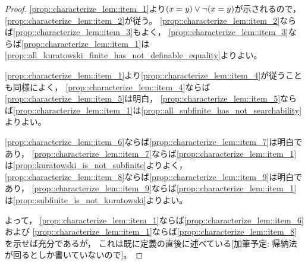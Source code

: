 \begin{proof}
    \cref{prop::characterize_lem::item_1}より\((x=y)\vee\neg(x=y)\)が示されるので，
    \cref{prop::characterize_lem::item_2}が従う。
    \cref{prop::characterize_lem::item_2}ならば\cref{prop::characterize_lem::item_3}もよく，
    \cref{prop::characterize_lem::item_3}ならば\cref{prop::characterize_lem::item_1}は\cref{prop::all_kuratowski_finite_has_not_definable_equality}よりよい。

    \cref{prop::characterize_lem::item_1}より\cref{prop::characterize_lem::item_4}が従うことも同様によく，
    \cref{prop::characterize_lem::item_4}ならば\cref{prop::characterize_lem::item_5}は明白，
    \cref{prop::characterize_lem::item_5}ならば\cref{prop::characterize_lem::item_1}は\cref{prop::all_subfinite_has_not_searchability}よりよい。

    \cref{prop::characterize_lem::item_6}ならば\cref{prop::characterize_lem::item_7}は明白であり，
    \cref{prop::characterize_lem::item_7}ならば\cref{prop::characterize_lem::item_1}は\cref{prop::kuratowski_is_not_subfinite}よりよく，
    \cref{prop::characterize_lem::item_8}ならば\cref{prop::characterize_lem::item_9}は明白であり，
    \cref{prop::characterize_lem::item_9}ならば\cref{prop::characterize_lem::item_1}は\cref{prop::subfinite_is_not_kuratowski}よりよい。

    よって，
    \cref{prop::characterize_lem::item_1}ならば\cref{prop::characterize_lem::item_6}および
    \cref{prop::characterize_lem::item_1}ならば\cref{prop::characterize_lem::item_8}を示せば充分であるが，
    これは既に定義の直後に述べている{\color{red}[加筆予定: 帰納法が回るとしか書いていないので]}。
\end{proof}
